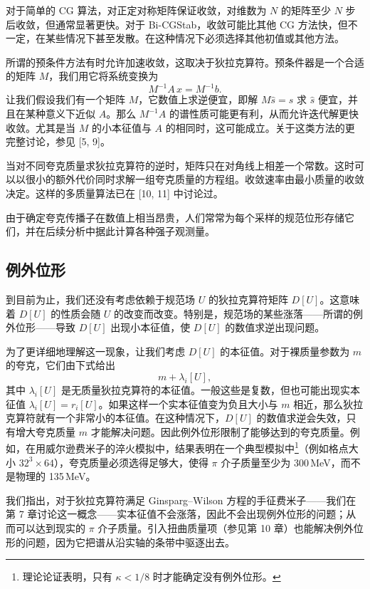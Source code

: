 对于简单的 CG 算法，对正定对称矩阵保证收敛，对维数为 $N$ 的矩阵至少 $N$ 步后收敛，但通常显著更快。对于 Bi-CGStab，收敛可能比其他 CG 方法快，但不一定，在某些情况下甚至发散。在这种情况下必须选择其他初值或其他方法。

所谓的预条件方法有时允许加速收敛，这取决于狄拉克算符。预条件器是一个合适的矩阵 $M$，我们用它将系统变换为
\begin{equation}
  M^{-1} A\, x = M^{-1} b .
\end{equation}
让我们假设我们有一个矩阵 $M$，它数值上求逆便宜，即解 $M\hat{s} = s$ 求 $\hat{s}$ 便宜，并且在某种意义下近似 $A$。那么 $M^{-1}A$ 的谱性质可能更有利，从而允许迭代解更快收敛。尤其是当 $M$ 的小本征值与 $A$ 的相同时，这可能成立。关于这类方法的更完整讨论，参见 [5, 9]。

当对不同夸克质量求狄拉克算符的逆时，矩阵只在对角线上相差一个常数。这时可以以很小的额外代价同时求解一组夸克质量的方程组。收敛速率由最小质量的收敛决定。这样的多质量算法已在 [10, 11] 中讨论过。

由于确定夸克传播子在数值上相当昂贵，人们常常为每个采样的规范位形存储它们，并在后续分析中据此计算各种强子观测量。

\subsection{例外位形}

到目前为止，我们还没有考虑依赖于规范场 $U$ 的狄拉克算符矩阵 $D[U]$。这意味着 $D[U]$ 的性质会随 $U$ 的改变而改变。特别是，规范场的某些涨落——所谓的例外位形——导致 $D[U]$ 出现小本征值，使 $D[U]$ 的数值求逆出现问题。

为了更详细地理解这一现象，让我们考虑 $D[U]$ 的本征值。对于裸质量参数为 $m$ 的夸克，它们由下式给出
\begin{equation}
  m + \lambda_i[U] ,
\end{equation}
其中 $\lambda_i[U]$ 是无质量狄拉克算符的本征值。一般这些是复数，但也可能出现实本征值 $\lambda_i[U] = r_i[U]$。如果这样一个实本征值变为负且大小与 $m$ 相近，那么狄拉克算符就有一个非常小的本征值。在这种情况下，$D[U]$ 的数值求逆会失效，只有增大夸克质量 $m$ 才能解决问题。因此例外位形限制了能够达到的夸克质量。例如，在用威尔逊费米子的淬火模拟中，结果表明在一个典型模拟中\footnote{理论论证表明，只有 $\kappa < 1/8$ 时才能确定没有例外位形。}（例如格点大小 $32^3 \times 64$），夸克质量必须选得足够大，使得 $\pi$ 介子质量至少为 300\,MeV，而不是物理的 135\,MeV。

我们指出，对于狄拉克算符满足 Ginsparg--Wilson 方程的手征费米子——我们在第 7 章讨论这一概念——实本征值不会涨落，因此不会出现例外位形的问题；从而可以达到现实的 $\pi$ 介子质量。引入扭曲质量项（参见第 10 章）也能解决例外位形的问题，因为它把谱从沿实轴的条带中驱逐出去。

